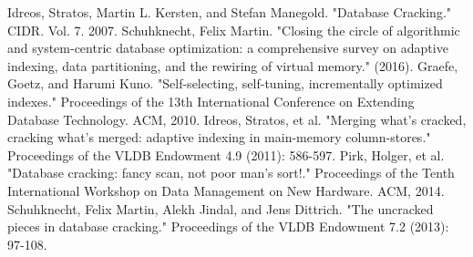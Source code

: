 \documentclass[10pt, conference, compsocconf]{IEEEtran}
\begin{document}
\begin{thebibliography}{6}

Idreos, Stratos, Martin L. Kersten, and Stefan Manegold. "Database Cracking." CIDR. Vol. 7. 2007.
Schuhknecht, Felix Martin. "Closing the circle of algorithmic and system-centric database optimization: a comprehensive survey on adaptive indexing, data partitioning, and the rewiring of virtual memory." (2016).
Graefe, Goetz, and Harumi Kuno. "Self-selecting, self-tuning, incrementally optimized indexes." Proceedings of the 13th International Conference on Extending Database Technology. ACM, 2010.
Idreos, Stratos, et al. "Merging what's cracked, cracking what's merged: adaptive indexing in main-memory column-stores." Proceedings of the VLDB Endowment 4.9 (2011): 586-597.
Pirk, Holger, et al. "Database cracking: fancy scan, not poor man's sort!." Proceedings of the Tenth International Workshop on Data Management on New Hardware. ACM, 2014.
Schuhknecht, Felix Martin, Alekh Jindal, and Jens Dittrich. "The uncracked pieces in database cracking." Proceedings of the VLDB Endowment 7.2 (2013): 97-108.

\end{thebibliography}
\end{document}
